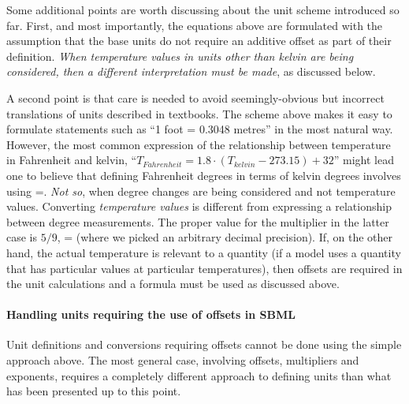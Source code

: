 Some additional points are worth discussing about the unit scheme
introduced so far.  First, and most importantly, the equations
above are formulated with the assumption that the base units do
not require an additive offset as part of their definition.
\emph{When temperature values in units other than kelvin are being
  considered, then a different interpretation must be made}, as
discussed below.

A second point is that care is needed to avoid seemingly-obvious
but incorrect translations of units described in textbooks.  The
scheme above makes it easy to formulate statements such as ``1
foot = 0.3048 metres'' in the most natural way.  However, the most
common expression of the relationship between temperature in
Fahrenheit and kelvin, ``$T_{Fahrenheit} = 1.8 \cdot (T_{kelvin} -
273.15) + 32$'' might lead one to believe that defining Fahrenheit
degrees in terms of kelvin degrees involves using
=.  \emph{Not so}, when degree changes
are being considered and not temperature values.  Converting
\emph{temperature values} is different from expressing a
relationship between degree measurements.  The proper value for
the multiplier in the latter case is $5/9$, \ie
{}= (where we picked an arbitrary
decimal precision).  If, on the other hand, the actual temperature
is relevant to a quantity (\eg if a model uses a quantity that has
particular values at particular temperatures), then offsets are
required in the unit calculations and a formula must be used as
discussed above.


\paragraph{Handling units requiring the use of offsets in SBML \thisLV}

Unit definitions and conversions requiring offsets cannot be done
using the simple approach above.  The most general case, involving
offsets, multipliers and exponents, requires a completely
different approach to defining units than what has been presented
up to this point.


